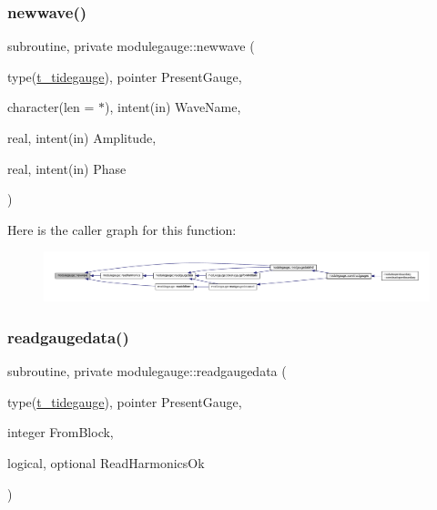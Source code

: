 \subsubsection{\texorpdfstring{newwave()}{newwave()}}
{\footnotesize\ttfamily subroutine, private modulegauge\+::newwave (\begin{DoxyParamCaption}\item[{type(\mbox{\hyperlink{structmodulegauge_1_1t__tidegauge}{t\+\_\+tidegauge}}), pointer}]{Present\+Gauge,  }\item[{character(len = $\ast$), intent(in)}]{Wave\+Name,  }\item[{real, intent(in)}]{Amplitude,  }\item[{real, intent(in)}]{Phase }\end{DoxyParamCaption})\hspace{0.3cm}{\ttfamily [private]}}

Here is the caller graph for this function\+:\nopagebreak
\begin{figure}[H]
\begin{center}
\leavevmode
\includegraphics[width=350pt]{namespacemodulegauge_ad253767480082a0c9e00cc725e85786e_icgraph}
\end{center}
\end{figure}
\mbox{\label{namespacemodulegauge_a6be887d8098d9844b158ef75048c3473}} 
\subsubsection{\texorpdfstring{readgaugedata()}{readgaugedata()}}
{\footnotesize\ttfamily subroutine, private modulegauge\+::readgaugedata (\begin{DoxyParamCaption}\item[{type(\mbox{\hyperlink{structmodulegauge_1_1t__tidegauge}{t\+\_\+tidegauge}}), pointer}]{Present\+Gauge,  }\item[{integer}]{From\+Block,  }\item[{logical, optional}]{Read\+Harmonics\+Ok }\end{DoxyParamCaption})\hspace{0.3cm}{\ttfamily [private]}}


